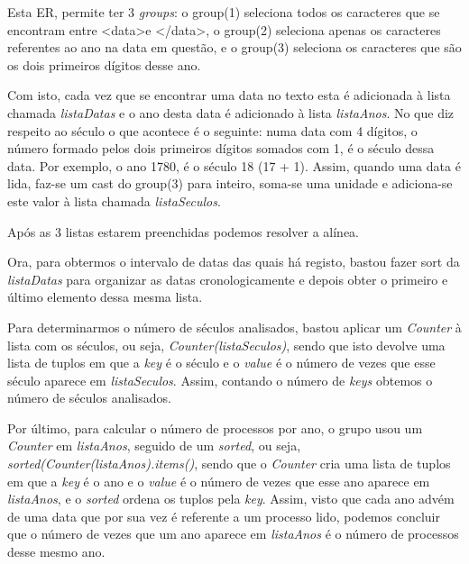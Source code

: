 \documentclass[11pt,a4paper]{report}
\begin{document}
       \qquad Esta ER, permite ter 3 \textit{groups}: o group(1) seleciona todos os caracteres que se encontram entre \textless data\textgreater e \textless/data\textgreater, o group(2) seleciona apenas os caracteres referentes ao ano na data em questão, e o group(3) seleciona os caracteres que são os dois primeiros dígitos desse ano.\par
       \qquad Com isto, cada vez que se encontrar uma data no texto esta é adicionada à lista chamada \textit{listaDatas} e o ano desta data é adicionado à lista \textit{listaAnos}. No que diz respeito ao século o que acontece é o seguinte: numa data com 4 dígitos, o número formado pelos dois primeiros dígitos somados com 1, é o século dessa data. Por exemplo, o ano 1780, é o século 18 (17 + 1). Assim, quando uma data é lida, faz-se um cast do group(3) para inteiro, soma-se uma unidade e adiciona-se este valor à lista chamada \textit{listaSeculos}.\par
       \qquad Após as 3 listas estarem preenchidas podemos resolver a alínea.\par 
       \qquad Ora, para obtermos o intervalo de datas das quais há registo, bastou fazer sort da \textit{listaDatas} para organizar as datas cronologicamente e depois obter o primeiro e último elemento dessa mesma lista.\par
       \qquad Para determinarmos o número de séculos analisados, bastou aplicar um \textit{Counter} à lista com os séculos, ou seja, \textit{Counter(listaSeculos)}, sendo que isto devolve uma lista de tuplos em que a \textit{key} é o século e o \textit{value} é o número de vezes que esse século aparece em \textit{listaSeculos}. Assim, contando o número de \textit{keys} obtemos o número de séculos analisados.\par
       \qquad Por último, para calcular o número de processos por ano, o grupo usou um \textit{Counter} em \textit{listaAnos}, seguido de um \textit{sorted}, ou seja, \textit{sorted(Counter(listaAnos).items()}, sendo que o \textit{Counter} cria uma lista de tuplos em que a \textit{key} é o ano e o \textit{value} é o número de vezes que esse ano aparece em \textit{listaAnos}, e o \textit{sorted} ordena os tuplos pela \textit{key}. Assim, visto que cada ano advém de uma data que por sua vez é referente a um processo lido, podemos concluir que o número de vezes que um ano aparece em \textit{listaAnos} é o número de processos desse mesmo ano.
\end{document}

